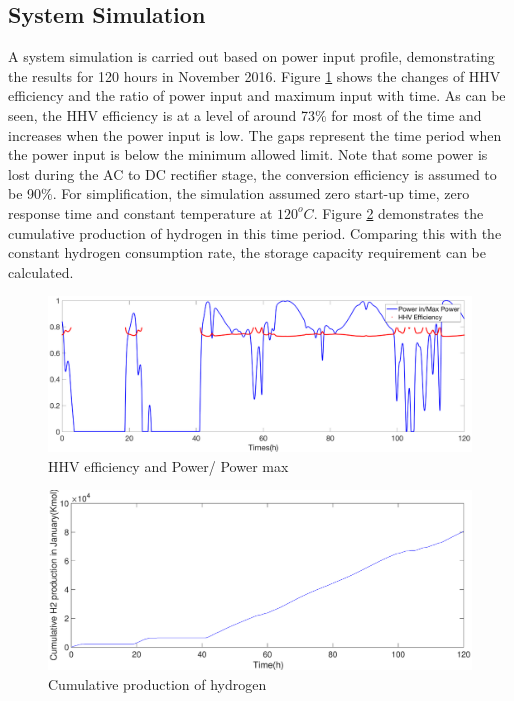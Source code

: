 \subsection{System Simulation}
A system simulation is carried out based on power input profile,  demonstrating the results for 120 hours in November 2016.  Figure \ref{fig:simulation}  shows the changes of  HHV efficiency and the ratio of power input and maximum input with time. As can be seen, the HHV efficiency is at a level of around 73\% for most of the time and increases when the power input is low. The gaps represent the time period when the power input is below the minimum allowed limit. Note that some power is lost during the AC to DC rectifier stage, the conversion efficiency is assumed to be 90\%. For simplification, the simulation assumed zero start-up time, zero response time and constant temperature at $120^oC$. Figure \ref{cumulative} demonstrates the cumulative production of hydrogen in this time period. Comparing this with the constant hydrogen consumption rate, the storage capacity requirement can be calculated. 
\begin{figure}[htb]
\centering
\includegraphics[width = 18cm]{simulation.eps}
\caption{HHV efficiency and Power/ Power max}
\label{fig:simulation}
\end{figure}

\begin{figure}[htb]
\centering
\includegraphics[width = 16cm]{cumulative.eps}
\caption{Cumulative production of hydrogen }
\label{cumulative}
\end{figure}

